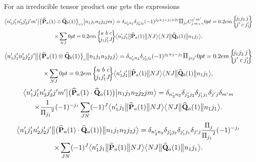 For an irreducible tensor product one gets the expressions
\begin{multline}
\braOket{ n_{1}^{\prime} j_{1}^{\prime} n_{2}^{\prime} j_{2}^{\prime} j^{\prime} m^{\prime}}{\bigl\{\widehat{\vect{P}}_{a}(1) \otimes \widehat{\vect{Q}}_{b}(1)\bigr\}_{c \gamma}}{n_{1} j_{1} n_{2} j_{2} j m}=\delta_{n_{2}^{\prime} n_{2}} \delta_{j_{2}^{\prime} j_{2}}(-1)^{j_{2}+j-j_{1}+2 c} \Fact{j c} 
\clebsch{j}{m}{c}{\gamma}{j^{\prime}}{m^{\prime}}
\sixj{j_{1}}{j_{2}}{j}{j^{\prime}}{c}{j_{1}^{\prime}} \\
\times \sum_{N J}
\sixj{a}{b}{c}{j_{1}}{j_{1}^{\prime}}{J}
\braOketred{ n_{1}^{\prime} j_{1}^{\prime}}{\widehat{\vect{P}}_{a}(1)}{ N J}
\braOketred{ N J}{\widehat{\vect{Q}}_{b}(1)}{ n_{1} j_{1}},  \label{eq:13:1:42}
\end{multline}
\begin{multline*}
\braOketred{ n_{1}^{\prime} j_{1}^{\prime} n_{2}^{\prime} j_{2}^{\prime} j^{\prime}}{\bigl\{\widehat{\vect{P}}_{a}(1) \otimes \widehat{\vect{Q}}_{b}(1)\bigr\}_{c}}{n_{1} j_{1} n_{2} j_{2} j}=\delta_{n_{2}^{\prime} n_{2}} \delta_{j_{2}^{\prime} j_{2}}(-1)^{j_{2}+j-j_{1}} \Fact{j c j^{\prime}}
\sixj{j_{1}}{j_{2}}{j}{j^{\prime}}{c}{j_{1}^{\prime}} \\
\times \sum_{N J}
\sixj{a}{b}{c}{j_{1}}{j_{1}^{\prime}}{J}
\braOketred{ n_{1}^{\prime} j_{1}^{\prime}}{\widehat{\vect{P}}_{a}(1)}{ N J}
\braOketred{ N J}{\widehat{\vect{Q}}_{b}(1)}{ n_{1} j_{1}},
\end{multline*}
\begin{multline}
\braOket{ n_{1}^{\prime} j_{1}^{\prime} n_{2}^{\prime} j_{2}^{\prime} j^{\prime} m^{\prime}}{\bigl(\widehat{\vect{P}}_{a}(1) \cdot \widehat{\vect{Q}}_{a}(1)\bigr)}{n_{1} j_{1} n_{2} j_{2} j m}=\delta_{n_{2}^{\prime} n_{2}} \delta_{j_{2}^{\prime} j_{2}} \delta_{j_{1}^{\prime} j_{1}} \delta_{j^{\prime} j} \delta_{m^{\prime} m} \\
\times \frac{1}{\Fact{j_{1}}^{2}}(-1)^{-j_{1}} \sum_{J N}(-1)^{J}
\braOketred{n_{1}^{\prime} j_{1}}{\widehat{\vect{P}}_{a}(1)}{ N J}
\braOketred{ N J}{\widehat{\vect{Q}}_{a}(1)}{ n_{1} j_{1}}. \label{eq:13:1:43}
\end{multline}
\begin{multline*}
\braOketred{ n_{1}^{\prime} j_{1}^{\prime} n_{2}^{\prime} j_{2}^{\prime} j^{\prime}}{\bigl(\widehat{\vect{P}}_{a}(1) \cdot \widehat{\vect{Q}}_{a}(1)\bigr)}{n_{1} j_{1} n_{2} j_{2} j}=\delta_{n_{2}^{\prime} n_{2}} \delta_{j_{2}^{\prime} j_{2}} \delta_{j_{1}^{\prime} j_{1}} \delta_{j^{\prime} j} \frac{\Fact{j}}{\Fact{j_{1}}^{2}}(-1)^{-j_{1}} \\
\times \sum_{J N}(-1)^{J}
\braOketred{n_{1}^{\prime} j_{1}}{\widehat{\vect{P}}_{a}(1)}{ N J}
\braOketred{ N J}{\widehat{\vect{Q}}_{a}(1)}{ n_{1} j_{1}}.
\end{multline*}
